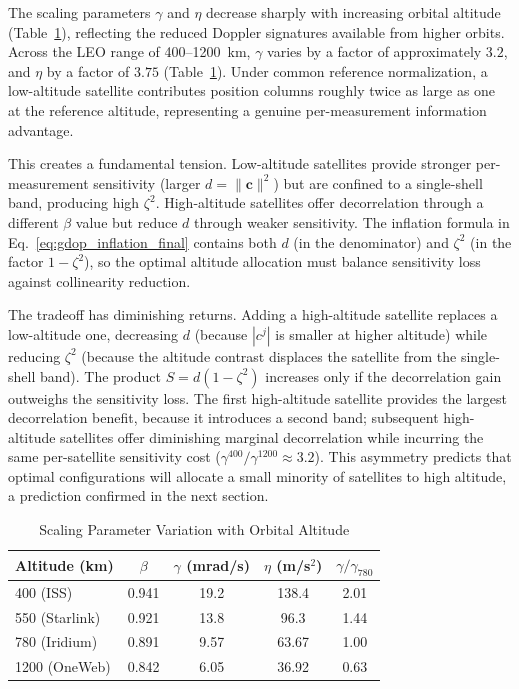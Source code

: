 \documentclass[letterpaper,times]{IONconf-v2}
\theoremstyle{plain}
\theoremstyle{remark}
\begin{document}
The scaling parameters $\gamma$ and $\eta$ decrease sharply with increasing orbital altitude (Table~\ref{tab:scaling_altitude}), reflecting the reduced Doppler signatures available from higher orbits. Across the LEO range of 400--1200~km, $\gamma$ varies by a factor of approximately $3.2$, and $\eta$ by a factor of $3.75$ (Table~\ref{tab:scaling_altitude}). Under common reference normalization, a low-altitude satellite contributes position columns roughly twice as large as one at the reference altitude, representing a genuine per-measurement information advantage.

This creates a fundamental tension. Low-altitude satellites provide stronger per-measurement sensitivity (larger $d = \|\mathbf{c}\|^2$) but are confined to a single-shell band, producing high $\zeta^2$. High-altitude satellites offer decorrelation through a different $\beta$ value but reduce $d$ through weaker sensitivity. The inflation formula in Eq.~\eqref{eq:gdop_inflation_final} contains both $d$ (in the denominator) and $\zeta^2$ (in the factor $1-\zeta^2$), so the optimal altitude allocation must balance sensitivity loss against collinearity reduction.

The tradeoff has diminishing returns. Adding a high-altitude satellite replaces a low-altitude one, decreasing $d$ (because $|c^j|$ is smaller at higher altitude) while reducing $\zeta^2$ (because the altitude contrast displaces the satellite from the single-shell band). The product $S = d(1-\zeta^2)$ increases only if the decorrelation gain outweighs the sensitivity loss. The first high-altitude satellite provides the largest decorrelation benefit, because it introduces a second band; subsequent high-altitude satellites offer diminishing marginal decorrelation while incurring the same per-satellite sensitivity cost ($\gamma^{400}/\gamma^{1200} \approx 3.2$). This asymmetry predicts that optimal configurations will allocate a small minority of satellites to high altitude, a prediction confirmed in the next section.

\vspace{-10pt}

\begin{table}[htb]
\caption{Scaling Parameter Variation with Orbital Altitude}
\label{tab:scaling_altitude}
\centering
\footnotesize
\begin{tabular}{lcccc}
\toprule
Altitude (km) & $\beta$ & $\gamma$ (mrad/s) & $\eta$ (m/s$^2$) & $\gamma/\gamma_{780}$ \\
\midrule
400 (ISS)      & 0.941 & 19.2  & 138.4 & 2.01 \\
550 (Starlink) & 0.921 & 13.8  &  96.3 & 1.44 \\
780 (Iridium)  & 0.891 &  9.57 &  63.67 & 1.00 \\
1200 (OneWeb)  & 0.842 &  6.05 &  36.92 & 0.63 \\
\bottomrule
\end{tabular}%
\vspace{-10pt} 
%
\end{table}
\end{document}
